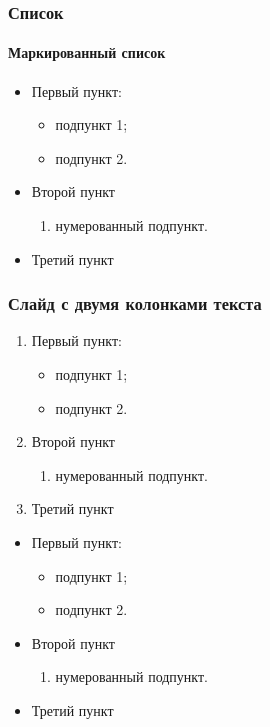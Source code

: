 \documentclass{beamer}
\begin{document}
\begin{frame}
\frametitle{Список}
\framesubtitle{Маркированный список}
	\begin{itemize}
		\item Первый пункт:
		\begin{itemize}
			\item подпункт 1;
			\item подпункт 2.
		\end{itemize}
		\item Второй пункт
		\begin{enumerate}
			\item нумерованный подпункт.
		\end{enumerate}
		\item Третий пункт
	\end{itemize}
\end{frame}

\begin{frame}
\frametitle{Слайд с двумя колонками текста}
	\begin{multicols}{2}
			\begin{enumerate} 
		\item Первый пункт:
		\begin{itemize}
			\item подпункт 1;
			\item подпункт 2.
		\end{itemize}
		\item Второй пункт
		\begin{enumerate}
			\item нумерованный подпункт.
		\end{enumerate} 
		\item Третий пункт
	\end{enumerate} 
	\columnbreak
	\begin{itemize}
		\item Первый пункт:
		\begin{itemize}
			\item подпункт 1;
			\item подпункт 2.
		\end{itemize}
		\item Второй пункт
		\begin{enumerate}
			\item нумерованный подпункт.
		\end{enumerate}
		\item Третий пункт
	\end{itemize}
	\end{multicols}
\end{frame}
\end{document}

